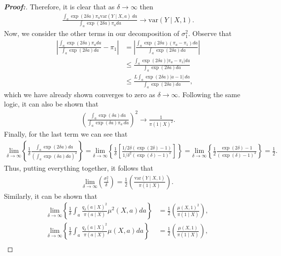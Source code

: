 \documentclass[11pt,twoside]{article}
\newcommand{\var}{\text{var}}
\theoremstyle{definition}
\theoremstyle{remark}
\begin{document}
\begin{proof}[\textbf{Proof:}]
Therefore, it is clear that as $\delta \to \infty$ then
\begin{align*}
    \frac{\int_a \exp(2 \delta a) \pi_a \var(Y \mid X, a) \ da}{\int_a \exp(2 \delta a) \pi_a da } \longrightarrow \var(Y \mid X, 1).
\end{align*}
Now, we consider the other terms in our decomposition of $\sigma^2_1$. Observe that
\begin{align*}
    \left| \frac{ \int_a \exp(2 \delta a) \pi_a   da}{ \int_a \exp(2 \delta a)da } - \pi_1 \right| &= \left| \frac{\int_a  \exp(2 \delta a) (\pi_a - \pi_1)  da}{ \int_a \exp(2 \delta a) da }  \right| \\
    &\leq  \frac{\int_a  \exp(2 \delta a) \left|\pi_a - \pi_1 \right|  da}{ \int_a \exp(2 \delta a) da }   \\
    &\leq \frac{L \int_a  \exp(2 \delta a) |a - 1|  \ da}{ \int_a \exp(2 \delta a)da },
\end{align*}
which we have already shown converges to zero as $\delta \to \infty$. Following the same logic, it can also be shown that
\begin{align*}
    \left( \frac{ \int_a \exp(\delta a) da }{ \int_a  \exp(\delta a) \pi_a \ da } \right)^2 \longrightarrow \frac{1}{\pi(1 \mid X)^2}.
\end{align*}
Finally, for the last term we can see that 
\begin{align*}
    \underset{\delta \to \infty}{\text{lim}}\left\{ \frac{1}{\delta} \frac{\int_a \exp(2 \delta a)  da}{\left( \int_a \exp(\delta a)  da \right)^2} \right\} = \underset{\delta \to \infty}{\text{lim}}\left\{ \frac{1}{\delta} \left[ \frac{1/2\delta (\exp(2 \delta) 
- 1)}{1/\delta^2 (\exp(\delta) - 1)^2}\right] \right\} = \underset{\delta \to \infty}{\text{lim}}\left\{ \frac{1}{2} \frac{\exp(2 \delta) - 1}{(\exp(\delta) - 1)^2} \right\} = \frac{1}{2}.
\end{align*}
Thus, putting everything together, it follows that
\begin{align*}
    \underset{\delta \to \infty}{\text{lim}}\left( \frac{\sigma^2_1}{\delta} \right) = \frac{1}{2} \left( \frac{\var(Y\mid X,1)}{\pi(1\mid X)}\right).
\end{align*}
Similarly, it can be shown that
\begin{align*}
     \underset{\delta \to \infty}{\text{lim}}\left\{ \frac{1}{\delta}\int_a \frac{q_\delta(a\mid X)^2}{\pi(a\mid X)}\mu^2(X,a)da \right\} &= \frac{1}{2} \left(\frac{\mu(X,1)^2}{\pi(1\mid X)} \right), \\
     \underset{\delta \to \infty}{\text{lim}}\left\{\frac{1}{\delta}\int_a \frac{q_\delta(a\mid X)^2}{\pi(a\mid X)}\mu(X,a)da \right\} &= \frac{1}{2} \left( \frac{\mu(X,1)}{\pi(1\mid X)} \right) ,\\

\end{align*}
\end{proof}
\end{document}
